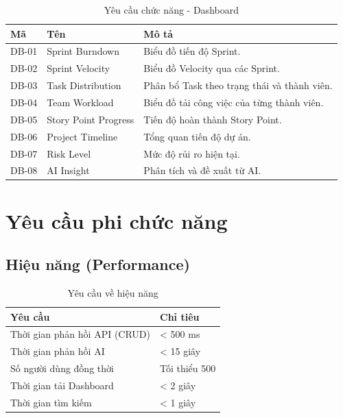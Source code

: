 \documentclass[12pt,a4paper]{report}
\begin{document}
\begin{table}[H]
\centering
\caption{Yêu cầu chức năng - Dashboard}
\begin{tabular}{|p{2.5cm}|p{3.5cm}|p{8cm}|}
\hline
\textbf{Mã} & \textbf{Tên} & \textbf{Mô tả} \\
\hline
DB-01 & Sprint Burndown & Biểu đồ tiến độ Sprint. \\
\hline
DB-02 & Sprint Velocity & Biểu đồ Velocity qua các Sprint. \\
\hline
DB-03 & Task Distribution & Phân bổ Task theo trạng thái và thành viên. \\
\hline
DB-04 & Team Workload & Biểu đồ tải công việc của từng thành viên. \\
\hline
DB-05 & Story Point Progress & Tiến độ hoàn thành Story Point. \\
\hline
DB-06 & Project Timeline & Tổng quan tiến độ dự án. \\
\hline
DB-07 & Risk Level & Mức độ rủi ro hiện tại. \\
\hline
DB-08 & AI Insight & Phân tích và đề xuất từ AI. \\
\hline
\end{tabular}
\label{tab:dashboard_requirements}
\end{table}

\section{Yêu cầu phi chức năng}

\subsection{Hiệu năng (Performance)}

\begin{table}[H]
\centering
\caption{Yêu cầu về hiệu năng}
\begin{tabular}{|p{5cm}|p{8cm}|}
\hline
\textbf{Yêu cầu} & \textbf{Chỉ tiêu} \\
\hline
Thời gian phản hồi API (CRUD) & < 500 ms \\
\hline
Thời gian phản hồi AI & < 15 giây \\
\hline
Số người dùng đồng thời & Tối thiểu 500 \\
\hline
Thời gian tải Dashboard & < 2 giây \\
\hline
Thời gian tìm kiếm & < 1 giây \\
\hline
\end{tabular}
\label{tab:performance_requirements}
\end{table}
\end{document}
